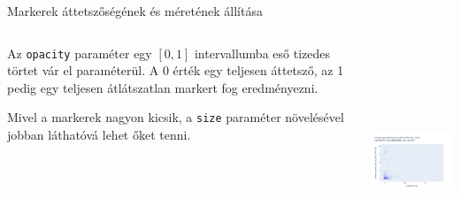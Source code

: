 \documentclass[english, aspectratio=169]{beamer}
\begin{document}
	\begin{frame}[fragile]{Markerek áttetszőségének és méretének állítása}
		\begin{columns}
			\begin{column}{.5\textwidth}
				Az \texttt{opacity} paraméter egy $\left[0,1\right]$ intervallumba eső tizedes törtet vár el paraméterül. A 0 érték egy teljesen áttetsző, az 1 pedig egy teljesen átlátszatlan markert fog eredményezni.\par\medskip
				Mivel a markerek nagyon kicsik, a \texttt{size} paraméter növelésével jobban láthatóvá lehet őket tenni.
			\end{column}
			\begin{column}{.5\textwidth}
				\begin{center}
					\includegraphics[width=7cm, height=7cm, keepaspectratio]{images/scatter_14.png}
				\end{center}
			\end{column}
		\end{columns}
	\end{frame}
	
\end{document}

